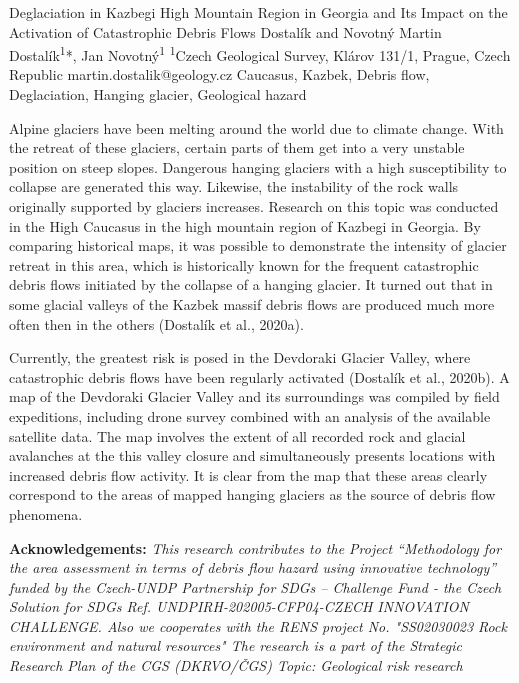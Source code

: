 \abstract
{Deglaciation in Kazbegi High Mountain Region in Georgia and Its Impact on the Activation of Catastrophic Debris Flows} 
{Dostalík and Novotný} 
{Martin Dostalík\textsuperscript{1}*, Jan Novotný\textsuperscript{1}} 
{\TLtag} 
{
\textsuperscript{1}Czech Geological Survey, Klárov 131/1, Prague, Czech Republic
}
{martin.dostalik@geology.cz}  %
{Caucasus, Kazbek, Debris flow, Deglaciation, Hanging glacier, Geological hazard}
{Alpine glaciers have been melting around the world due to climate change. With the retreat of these glaciers, certain parts of them get into a very unstable position on steep slopes. Dangerous hanging glaciers with a high susceptibility to collapse are generated this way. Likewise, the instability of the rock walls originally supported by glaciers increases. 
Research on this topic was conducted in the High Caucasus in the high mountain region of Kazbegi in Georgia. By comparing historical maps, it was possible to demonstrate the intensity of glacier retreat in this area, which is historically known for the frequent catastrophic debris flows initiated by the collapse of a hanging glacier. It turned out that in some glacial valleys of the Kazbek massif debris flows are produced much more often then in the others (Dostalík et al., 2020a). 

Currently, the greatest risk is posed in the Devdoraki Glacier Valley, where catastrophic debris flows have been regularly activated (Dostalík et al., 2020b). A map of the Devdoraki Glacier Valley and its surroundings was compiled by field expeditions, including drone survey combined with an analysis of the available satellite data. The map involves the extent of all recorded rock and glacial avalanches at the this valley closure and simultaneously presents locations with increased debris flow activity. It is clear from the map that these areas clearly correspond to the areas of mapped hanging glaciers as the source of debris flow phenomena.

\vspace{0.5em}
\noindent
\textbf{Acknowledgements:}
\textit{This research contributes to the Project “Methodology for the area assessment in terms of debris flow hazard using innovative technology” funded by the Czech-UNDP Partnership for SDGs – Challenge Fund - the Czech Solution for SDGs Ref. UNDPIRH-202005-CFP04-CZECH INNOVATION CHALLENGE. 
	Also we cooperates with the RENS project No. "SS02030023 Rock environment and natural resources" 
	The research is a part of the Strategic Research Plan of the CGS (DKRVO/ČGS) Topic: Geological risk research}
}
